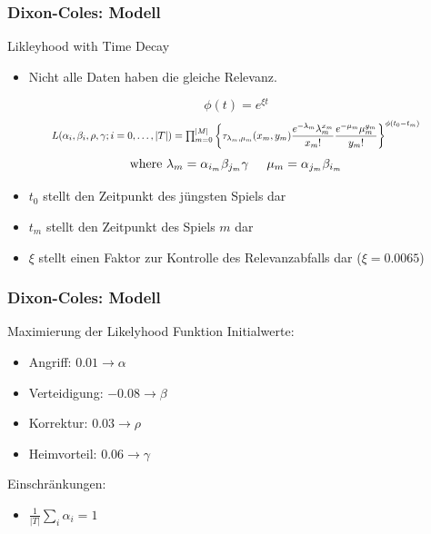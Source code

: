 \documentclass{beamer}
\newcommand*{\Scale}[2][4]{\scalebox{#1}{$#2$}}%
\begin{document}
    \begin{frame}
        \frametitle{Dixon-Coles: Modell}
        \begin{block}{Likleyhood with Time Decay}
            \begin{itemize}
                \item Nicht alle Daten haben die gleiche Relevanz.
            \end{itemize}
            \[
                \phi(t) = e^{\xi t}
            \]\vspace{1pt}\[\Scale[.8]{
                L(\alpha_i, \beta_i, \rho, \gamma; i = 0,\hdots, |T|) =
                \prod_{m = 0}^{|M|} \left\{
                    \tau_{\lambda_m,\mu_m}(x_m, y_m) \dfrac{e^{-\lambda_m}\lambda_m^{x_m}}{x_m!} \dfrac{e^{-\mu_m}\mu_m^{y_m}}{y_m!}
                \right\}^{\phi(t_0 - t_m)}
            }\]\vspace{1pt}\[
                \text{where }
                \lambda_m = \alpha_{i_m}\beta_{j_m}\gamma \hspace{.5cm}
                \mu_m = \alpha_{j_m}\beta_{i_m}
            \]
            \begin{itemize}
                \item $t_0$ stellt den Zeitpunkt des jüngsten Spiels dar
                \item $t_m$ stellt den Zeitpunkt des Spiels $m$ dar
                \item $\xi$ stellt einen Faktor zur Kontrolle des Relevanzabfalls dar ($\xi = 0.0065$)
            \end{itemize}
        \end{block}
    \end{frame}
    \begin{frame}
        \frametitle{Dixon-Coles: Modell}
        \begin{block}{Maximierung der Likelyhood Funktion}
            Initialwerte:
            \begin{itemize}
                \item Angriff: $0.01 \rightarrow \alpha$
                \item Verteidigung: $-0.08 \rightarrow \beta$
                \item Korrektur: $0.03 \rightarrow \rho$
                \item Heimvorteil: $0.06 \rightarrow \gamma$
            \end{itemize}
            Einschränkungen:
            \begin{itemize}
                \item $\frac{1}{|T|} \sum_i \alpha_i = 1$
            \end{itemize}
        \end{block}
    \end{frame}
\end{document}
